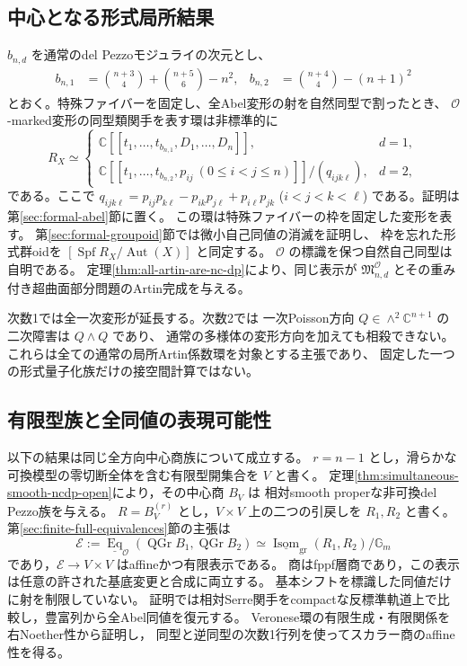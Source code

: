 \documentclass[a4paper,11pt]{ltjsarticle}
\numberwithin{equation}{section}
\theoremstyle{plain}
\theoremstyle{definition}
\theoremstyle{remark}
\newcommand{\C}{\mathbb C}
\newcommand{\Gm}{\mathbb G_m}
\newcommand{\OO}{\mathcal O}
\newcommand{\Spf}{\operatorname{Spf}}
\newcommand{\Aut}{\operatorname{Aut}}
\newcommand{\QGr}{\operatorname{QGr}}
\begin{document}
\subsection{中心となる形式局所結果}
$b_{n,d}$ を通常のdel Pezzoモジュライの次元とし、
\begin{align}
 b_{n,1}&=\binom{n+3}{4}+\binom{n+5}{6}-n^2,
 &b_{n,2}&=\binom{n+4}{4}-(n+1)^2
 \label{eq:base-dimensions}
\end{align}
とおく。特殊ファイバーを固定し、全Abel変形の射を自然同型で割ったとき、
$\OO$-marked変形の同型類関手を表す環は非標準的に
\begin{equation}
 R_X\simeq
 \begin{cases}
 \C[[t_1,\ldots,t_{b_{n,1}},D_1,\ldots,D_n]],& d=1,\\[2pt]
 \C[[t_1,\ldots,t_{b_{n,2}},p_{ij}\ (0\le i<j\le n)]]/(q_{ijk\ell}),& d=2,
 \end{cases}
 \label{eq:main-formal-ring}
\end{equation}
である。ここで
$q_{ijk\ell}=p_{ij}p_{k\ell}-p_{ik}p_{j\ell}+p_{i\ell}p_{jk}$
($i<j<k<\ell$) である。証明は第\ref{sec:formal-abel}節に置く。
この環は特殊ファイバーの枠を固定した変形を表す。
第\ref{sec:formal-groupoid}節では微小自己同値の消滅を証明し、
枠を忘れた形式群oidを $[\Spf R_X/\Aut(X)]$ と同定する。
$\OO$ の標識を保つ自然自己同型は自明である。
定理\ref{thm:all-artin-are-nc-dp}により、同じ表示が
$\mathfrak M^{\OO}_{n,d}$ とその重み付き超曲面部分問題のArtin完成を与える。

次数1では全一次変形が延長する。次数2では
一次Poisson方向 $Q\in\wedge^2\C^{n+1}$ の二次障害は $Q\wedge Q$ であり、
通常の多様体の変形方向を加えても相殺できない。
これらは全ての通常の局所Artin係数環を対象とする主張であり、
固定した一つの形式量子化族だけの接空間計算ではない。

\subsection{有限型族と全同値の表現可能性}
以下の結果は同じ全方向中心商族について成立する。
$r=n-1$ とし，滑らかな可換模型の零切断全体を含む有限型開集合を $V$ と書く。
定理\ref{thm:simultaneous-smooth-ncdp-open}により，その中心商 $B_V$ は
相対smooth properな非可換del Pezzo族を与える。
$R=B_V^{(r)}$ とし，$V\times V$ 上の二つの引戻しを $R_1,R_2$ と書く。
第\ref{sec:finite-full-equivalences}節の主張は
\begin{equation}\label{eq:intro-finite-equivalence}
 \mathcal E:=\underline{\operatorname{Eq}}_{\mathcal O}
       (\QGr B_1,\QGr B_2)
 \simeq\underline{\operatorname{Isom}}_{\mathrm{gr}}(R_1,R_2)/\Gm
\end{equation}
であり，$\mathcal E\to V\times V$ はaffineかつ有限表示である。
商はfppf層商であり，この表示は任意の許された基底変更と合成に両立する。
基本シフトを標識した同値だけに射を制限していない。
証明では相対Serre関手をcompactな反標準軌道上で比較し，豊富列から全Abel同値を復元する。
Veronese環の有限生成・有限関係を右Noether性から証明し，
同型と逆同型の次数1行列を使ってスカラー商のaffine性を得る。
\end{document}
